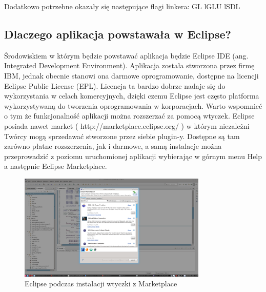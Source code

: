 Dodatkowo potrzebne okazały się następujące flagi linkera:
\-GL \-lGLU \-lSDL 



\subsection{Dlaczego aplikacja powstawała w Eclipse?}
\hspace{1cm} Środowiskiem w którym będzie powstawać aplikacja będzie Eclipse IDE (ang. Integrated Development Environment). Aplikacja została stworzona przez firmę IBM, jednak obecnie stanowi ona darmowe oprogramowanie, dostępne na licencji Eclipse Public License (EPL). Licencja ta bardzo dobrze nadaje się do wykorzystania w celach komercyjnych, dzięki czemu Eclipse jest często platforma wykorzystywaną do tworzenia oprogramowania w korporacjach. Warto wspomnieć o tym że funkcjonalność aplikacji można rozszerzać za pomocą wtyczek. Eclipse posiada nawet market ( http://marketplace.eclipse.org/ ) w którym niezależni Twórcy mogą sprzedawać stworzone przez siebie plugin-y.
Dostępne są tam zarówno płatne rozszerzenia, jak i darmowe, a samą instalacje można przeprowadzić z poziomu uruchomionej aplikacji wybierając w górnym menu Help a następnie Eclipse Marketplace.


\begin{figure}[h]
    \centering
    \includegraphics[width=0.8\textwidth,natwidth=480,natheight=142]{./Pictures/eclipse.png}
    \caption{Eclipse podczas instalacji wtyczki z Marketplace}
\end{figure}

